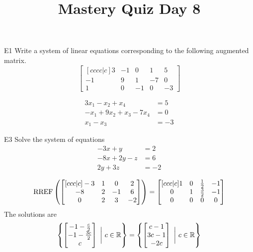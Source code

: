 \documentclass{sbgLAquiz}
\title{Mastery Quiz Day 8 }
\begin{document}
\begin{problem}{E1}
Write a system of linear equations corresponding to the following
augmented matrix.
\[
\begin{bmatrix}[cccc|c]
3 & -1 & 0 & 1 & 5 \\
-1 & 9 & 1 & -7 & 0 \\
1 & 0 & -1 & 0 & -3
\end{bmatrix}
\]
\end{problem}
\begin{solution}
\begin{align*}
3x_1-x_2+x_4 &= 5 \\
-x_1+9x_2+x_3-7x_4 &= 0 \\
x_1-x_3 &= -3
\end{align*}
\end{solution}

\begin{problem}{E3}
Solve the system of equations
\begin{align*}
-3x +y &= 2\\
-8x+2y-z &= 6 \\
2y+3z &= -2
\end{align*}


\end{problem}

\begin{solution}
$$\operatorname{RREF}\left(\begin{bmatrix}[ccc|c] -3 & 1 & 0 & 2 \\ -8 & 2 & -1 & 6 \\ 0 & 2 & 3 & -2 \end{bmatrix} \right) = \begin{bmatrix}[ccc|c] 1 & 0 & \frac{1}{2} & -1 \\ 0 & 1 & \frac{3}{2} & -1 \\ 0 & 0 & 0 & 0 \end{bmatrix}$$
The solutions are $$\left\{ \begin{bmatrix} -1-\frac{c}{2} \\ -1-\frac{3c}{2} \\ c \end{bmatrix}\ \bigg|\ c\in \mathbb{R}\right\} = \left\{ \begin{bmatrix} c-1 \\ 3c-1 \\ -2c  \end{bmatrix}\ \bigg|\ c\in \mathbb{R}\right\}$$
\end{solution}
\end{document}
